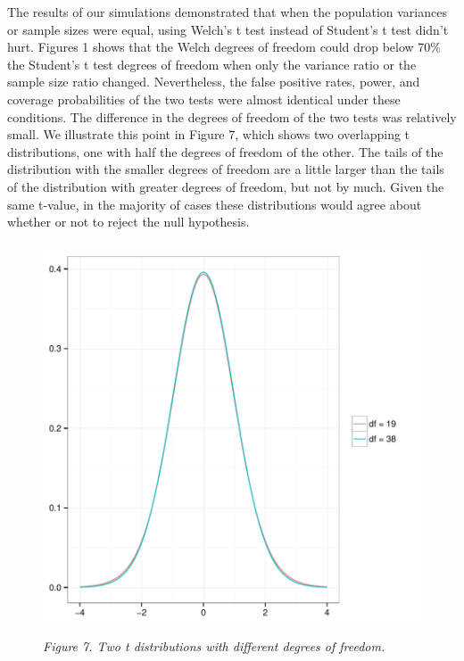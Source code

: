 \documentclass[man,a4paper,noextraspace,apacite]{apa6}
\begin{document}
    The results of our simulations demonstrated that when the population 
variances or sample sizes were equal, using Welch's t test instead of Student's 
t test didn't hurt. Figures 1 shows that the Welch degrees of freedom could 
drop below 70\% the Student's t test degrees of freedom when only the variance 
ratio or the sample size ratio changed. Nevertheless, the false positive rates, 
power, and coverage probabilities of the two tests were almost identical under 
these conditions. The difference in the degrees of freedom of the two tests was 
relatively small. We illustrate this point in Figure 7, which shows two 
overlapping t distributions, one with half the degrees of freedom of the other. 
The tails of the distribution with the smaller degrees of freedom are a little 
larger than the tails of the distribution with greater degrees of freedom, but 
not by much. Given the same t-value, in the majority of cases these 
distributions would agree about whether or not to reject the null hypothesis. 
    
\begin{figure}  
\includegraphics{WelchManuscript-MASTER-tdist}

\textit{Figure 7. Two t distributions with different degrees of freedom.}
\end{figure}
    
\end{document}
